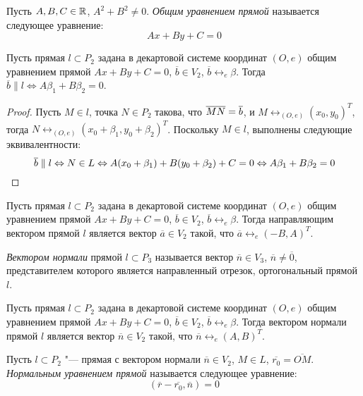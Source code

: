 \begin{definition}
	Пусть $A, B, C \in \mathbb{R}$, $A^2+B^2 \ne 0$. \textit{Общим уравнением прямой} называется следующее уравнение:
	\[Ax+By+C = 0\]
\end{definition}

\begin{proposition}
	Пусть прямая $l \subset P_2$ задана в декартовой системе координат $(O, e)$ общим уравнением прямой $Ax+By+C=0$, $\overline{b} \in V_2$, $\overline{b} \leftrightarrow_{e} \beta$. Тогда $\overline{b} \parallel l \Leftrightarrow A\beta_1 + B\beta_2 = 0$.
\end{proposition}

\begin{proof}
	Пусть $M \in l$, точка $N \in P_2$ такова, что $\overline{MN} \hm{=} \overline{b}$, и $M \leftrightarrow_{(O, e)} (x_0, y_0)^T$, тогда $N \leftrightarrow_{(O, e)} (x_0 + \beta_1, y_0 + \beta_2)^T$. Поскольку $M \in l$, выполнены следующие эквивалентности:
	\[\overline{b} \parallel l \Leftrightarrow N \in L \Leftrightarrow A(x_0 + \beta_1) + B(y_0 + \beta_2) + C = 0 \Leftrightarrow A\beta_1 + B\beta_2 = 0\qedhere\]
\end{proof}

\begin{corollary}
	Пусть прямая $l \subset P_2$ задана в декартовой системе координат $(O, e)$ общим уравнением прямой $Ax+By+C=0$, $\overline{b} \in V_2$, $\overline{b} \leftrightarrow_{e} \beta$. Тогда направляющим вектором прямой $l$ является вектор $\overline{a} \in V_2$ такой, что $\overline a \leftrightarrow_{e} (-B, A)^T$.
\end{corollary}

\begin{definition}
	\textit{Вектором нормали} прямой $l \subset P_3$ называется вектор $\overline{n} \in V_3$, $\overline{n} \ne \overline 0$, представителем которого является направленный отрезок, ортогональный прямой $l$.
\end{definition}

\begin{corollary}
	Пусть прямая $l \subset P_2$ задана в декартовой системе координат $(O, e)$ общим уравнением прямой $Ax+By+C=0$, $\overline{b} \in V_2$, $\overline{b} \leftrightarrow_{e} \beta$. Тогда вектором нормали прямой $l$ является вектор $\overline{n} \in V_2$ такой, что $\overline n \leftrightarrow_{e} (A, B)^T$.
\end{corollary}

\begin{definition}
	Пусть $l \subset P_2$ "--- прямая с вектором нормали $\overline{n} \in V_2$, $M \in L$, $\overline{r_0} = \overline{OM}$. \textit{Нормальным уравнением прямой} называется следующее уравнение:
	\[(\overline{r} - \overline{r_0}, \overline{n}) = 0\]
\end{definition}

